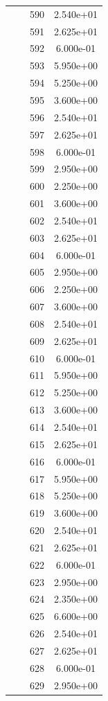 \documentclass[12pt]{article}
\begin{document}
\begin{longtable}{@{}cccc@{}}
 &  & 590 & 2.540e+01 \\
 &  & 591 & 2.625e+01 \\
 &  & 592 & 6.000e-01 \\
 &  & 593 & 5.950e+00 \\
 &  & 594 & 5.250e+00 \\
 &  & 595 & 3.600e+00 \\
 &  & 596 & 2.540e+01 \\
 &  & 597 & 2.625e+01 \\
 &  & 598 & 6.000e-01 \\
 &  & 599 & 2.950e+00 \\
 &  & 600 & 2.250e+00 \\
 &  & 601 & 3.600e+00 \\
 &  & 602 & 2.540e+01 \\
 &  & 603 & 2.625e+01 \\
 &  & 604 & 6.000e-01 \\
 &  & 605 & 2.950e+00 \\
 &  & 606 & 2.250e+00 \\
 &  & 607 & 3.600e+00 \\
 &  & 608 & 2.540e+01 \\
 &  & 609 & 2.625e+01 \\
 &  & 610 & 6.000e-01 \\
 &  & 611 & 5.950e+00 \\
 &  & 612 & 5.250e+00 \\
 &  & 613 & 3.600e+00 \\
 &  & 614 & 2.540e+01 \\
 &  & 615 & 2.625e+01 \\
 &  & 616 & 6.000e-01 \\
 &  & 617 & 5.950e+00 \\
 &  & 618 & 5.250e+00 \\
 &  & 619 & 3.600e+00 \\
 &  & 620 & 2.540e+01 \\
 &  & 621 & 2.625e+01 \\
 &  & 622 & 6.000e-01 \\
 &  & 623 & 2.950e+00 \\
 &  & 624 & 2.350e+00 \\
 &  & 625 & 6.600e+00 \\
 &  & 626 & 2.540e+01 \\
 &  & 627 & 2.625e+01 \\
 &  & 628 & 6.000e-01 \\
 &  & 629 & 2.950e+00 \\

\end{longtable}
\end{document}
